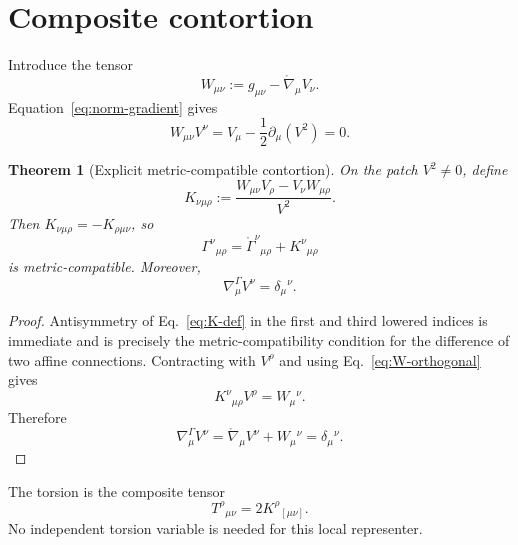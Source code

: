 \documentclass[12pt,a4paper]{article}
\newtheorem{theorem}[definition]{Theorem}
\theoremstyle{remark}\newtheorem{remark}[definition]{Remark}
\newcommand{\LC}{\mathring\nabla}
\begin{document}
\section{Composite contortion}
Introduce the tensor
\begin{equation}
 W_{\mu\nu}:=g_{\mu\nu}-\LC_\mu V_\nu.
 \label{eq:W-def}
\end{equation}
Equation~\eqref{eq:norm-gradient} gives
\begin{equation}
 W_{\mu\nu}V^\nu
 =V_\mu-\frac12\partial_\mu(V^2)=0.
 \label{eq:W-orthogonal}
\end{equation}

\begin{theorem}[Explicit metric-compatible contortion]
On the patch $V^2\ne0$, define
\begin{equation}
 \boxed{
 K_{\nu\mu\rho}
 :=\frac{W_{\mu\nu}V_\rho-V_\nu W_{\mu\rho}}{V^2}.}
 \label{eq:K-def}
\end{equation}
Then $K_{\nu\mu\rho}=-K_{\rho\mu\nu}$, so
\begin{equation}
 \Gamma^\nu{}_{\mu\rho}
 =\mathring\Gamma^\nu{}_{\mu\rho}+K^\nu{}_{\mu\rho}
 \label{eq:Gamma-K}
\end{equation}
is metric-compatible.  Moreover,
\begin{equation}
 \boxed{\nabla^{\Gamma}_\mu V^\nu=\delta_\mu{}^\nu.}
 \label{eq:torsionful-concurrent}
\end{equation}
\end{theorem}

\begin{proof}
Antisymmetry of Eq.~\eqref{eq:K-def} in the first and third lowered indices is
immediate and is precisely the metric-compatibility condition for the
difference of two affine connections.  Contracting with $V^\rho$ and using
Eq.~\eqref{eq:W-orthogonal} gives
\begin{equation}
 K^\nu{}_{\mu\rho}V^\rho=W_\mu{}^\nu.
\end{equation}
Therefore
\begin{equation}
 \nabla^{\Gamma}_\mu V^\nu
 =\LC_\mu V^\nu+W_\mu{}^\nu
 =\delta_\mu{}^\nu.
\end{equation}
\end{proof}

The torsion is the composite tensor
\begin{equation}
 T^\rho{}_{\mu\nu}=2K^\rho{}_{[\mu\nu]}.
 \label{eq:torsion}
\end{equation}
No independent torsion variable is needed for this local representer.
\end{document}
